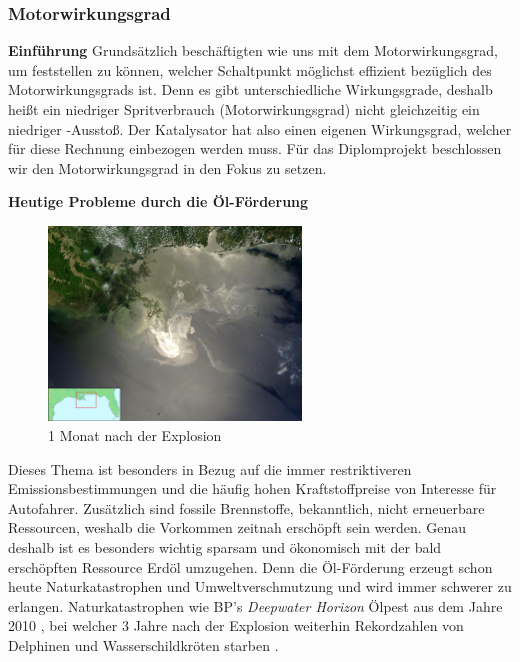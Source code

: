 \subsubsection{Motorwirkungsgrad}
\label{subsec:motorwirkungsgrad}

\textbf{Einführung\newline}
Grundsätzlich beschäftigten wie uns mit dem Motorwirkungsgrad, um feststellen zu können, welcher Schaltpunkt möglichst effizient bezüglich des Motorwirkungsgrads ist. Denn es gibt unterschiedliche Wirkungsgrade, deshalb heißt ein niedriger Spritverbrauch (Motorwirkungsgrad) nicht gleichzeitig ein niedriger -Ausstoß. Der Katalysator hat also einen eigenen Wirkungsgrad, welcher für diese Rechnung einbezogen werden muss. Für das Diplomprojekt beschlossen wir den Motorwirkungsgrad in den Fokus zu setzen.

\textbf{Heutige Probleme durch die Öl-Förderung}

\begin{figure}
	\centering
    \includegraphics[width=0.6\textwidth]{images/bpOilSpillSatelite}
    \caption{1 Monat nach der Explosion \cite{SIMR.CH2-motorwirkungsgrad.bpOilSpillSatelite}} \label{Fig:imgBPOilSpill}
\end{figure}

Dieses Thema ist besonders in Bezug auf die immer restriktiveren Emissionsbestimmungen und die häufig hohen Kraftstoffpreise von Interesse für Autofahrer. Zusätzlich sind fossile Brennstoffe, bekanntlich, nicht erneuerbare Ressourcen, weshalb die Vorkommen zeitnah erschöpft sein werden. Genau deshalb ist es besonders wichtig sparsam und ökonomisch mit der bald erschöpften Ressource Erdöl umzugehen. 
Denn die Öl-Förderung erzeugt schon heute Naturkatastrophen und Umweltverschmutzung und wird immer schwerer zu erlangen.
Naturkatastrophen wie BP's \textit{Deepwater Horizon} Ölpest aus dem Jahre 2010 \cite{SIMR.CH2-motorwirkungsgrad.BPSpillGeneral}, bei welcher 3 Jahre nach der Explosion weiterhin Rekordzahlen von Delphinen und Wasserschildkröten starben \cite{SIMR.CH2-motorwirkungsgrad.BPSpillDeaths}. 

